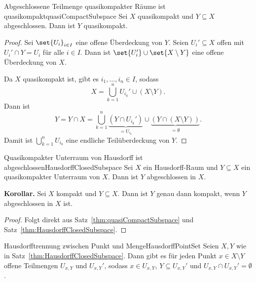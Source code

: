 \documentclass[language=ngerman]{TemplateLecture} %
\begin{document}
\begin{thm}{Abgeschlossene Teilmenge quasikompakter Räume ist quasikompakt}{quasiCompactSubspace}
    Sei $X$ quasikompakt und $Y \subseteq X$ abgeschlossen. Dann ist $Y$ quasikompakt.
\end{thm}
\begin{proof}
    Sei $\set{U_i}_{i \in I}$ eine offene Überdeckung von $Y$. Seien $U_i' \subseteq X$ offen mit $U_i' \cap Y = U_i$ für alle $i \in I$. Dann ist $\set{U_i'} \cup \set{X \setminus Y}$ eine offene Überdeckung von $X$. 

    Da $X$ quasikompakt ist, gibt es $i_1, \ldots, i_n \in I$, sodass 
    \begin{equation*}
        X = \bigcup_{k = 1}^n U_{i_k}' \cup (X \setminus Y).
    \end{equation*}
    Dann ist
    \begin{equation*}
        Y = Y \cap X = \bigcup_{k = 1}^n \underset{=U_{i_k}}{\underbrace{(Y \cap U_{i_k}')}} \cup \underset{= \emptyset}{\underbrace{(Y \cap (X \setminus Y))}}.
    \end{equation*}
    Damit ist $\bigcup_{k = 1}^n U_{i_k}$ eine endliche Teilüberdeckung von $Y$.
\end{proof}

\begin{thm}{Quasikompakter Unterraum von Hausdorff ist abgeschlossen}{HausdorffClosedSubspace}
    Sei $X$ ein Hausdorff-Raum und $Y \subseteq X$ ein quasikompakter Unterraum von $X$. Dann ist $Y$ abgeschlossen in $X$.
\end{thm}

\textbf{Korollar.} Sei $X$ kompakt und $Y \subseteq X$. Dann ist $Y$ genau dann kompakt, wenn $Y$ abgeschlossen in $X$ ist.
\begin{proof}
    Folgt direkt aus Satz~\ref{thm:quasiCompactSubspace} und Satz~\ref{thm:HausdorffClosedSubspace}.
\end{proof}

\begin{lem}{Hausdorfftrennung zwischen Punkt und Menge}{HausdorffPointSet}
    Seien $X, Y$ wie in Satz~\ref{thm:HausdorffClosedSubspace}. Dann gibt es für jeden Punkt $x \in X \setminus Y$ offene Teilmengen $U_{x,Y}$ und $U_{x,Y}'$, sodass $x \in U_{x,Y}$, $Y \subseteq U_{x,Y}'$ und $U_{x,Y} \cap U_{x,Y}' = \emptyset$.
\end{lem}
\end{document}
